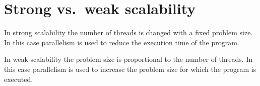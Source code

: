 \section{Strong vs.\ weak scalability}%
\label{sec:strong_vs_weak_scalability}


In strong scalability the number of threads is changed with a fixed problem  size. In this case parallelism is used to reduce the execution time of the program.

In weak scalability the problem size is proportional to the number of threads. In this case parallelism is used to increase the problem size for which the program is executed.

